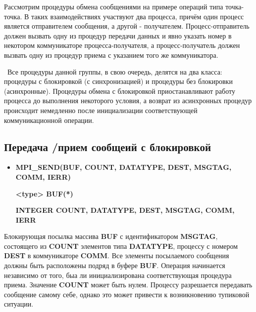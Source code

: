 \documentclass[14pt,a4paper,report]{ncc}
\begin{document}
Рассмотрим процедуры обмена сообщениями на примере операций типа точка-точка. В таких взаимодействиях участвуют два процесса, причём один процесс является отправителем сообщения, а другой - получателем. Процесс-отправитель должен вызвать одну из процедур передачи данных и явно указать номер в некотором коммуникаторе процесса-получателя, а процесс-получатель должен вызвать одну из процедур приема с указанием того же коммуникатора.

\ 
Все процедуры данной группы, в свою очередь, делятся на два класса: процедуры с блокировкой (с синхронизацией) и процедуры без блокировки (асинхронные). Процедуры обмена с блокировкой приостанавливают работу процесса до выполнения некоторого условия, а возврат из асинхронных процедур происходит немедленно после инициализации соответствующей коммуникационной операции.
\
\subsection{Передача /прием сообщеий с блокировкой}  
\begin{itemize}
\item\textbf{MPI\_SEND(BUF, COUNT, DATATYPE, DEST, MSGTAG,\\
 COMM, IERR)}
\

\textbf{<type> BUF(*)}
\

\textbf{INTEGER COUNT, DATATYPE, DEST, MSGTAG, COMM, IERR}
\
\end{itemize}
Блокирующая посылка массива \textbf{BUF} с идентификатором \textbf{MSGTAG}, состоящего из \textbf{COUNT} элементов типа \textbf{DATATYPE}, процессу с номером \textbf{DEST} в коммуникаторе \textbf{COMM}. Все элементы посылаемого сообщения должны быть расположены подряд в буфере \textbf{BUF}. Операция начинается независимо от того, быа ли инициализирована соответствующая процедура приема. Значение \textbf{COUNT} может быть нулем. Процессу разрешается передавать сообщение самому себе, однако это может привести к возникновению тупиковой ситуации.
\
\end{document}
